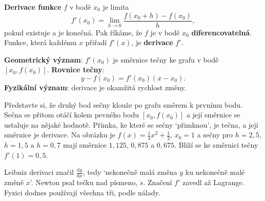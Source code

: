 \begin{definitionbox}
  \textbf{Derivace funkce} $f$ v bodě $x_0$ je limita
  \begin{equation*}
    f'(x_0) = \lim_{h\to 0}\frac{f(x_0 + h) - f(x_0)}{h},
  \end{equation*}
  pokud existuje a je konečná. Pak říkáme, že $f$ je v bodě $x_0$ \textbf{diferencovatelná}. Funkce, která každému $x$ přiřadí $f'(x)$, je \textbf{derivace} $f'$.

  \vspace{0.2cm}

  \textbf{Geometrický význam}: $f'(x_0)$ je směrnice tečny ke grafu v bodě $[x_0, f(x_0)]$. \textbf{Rovnice tečny}:
  \begin{equation*}
    y - f(x_0) = f'(x_0)(x - x_0).
  \end{equation*}
  \textbf{Fyzikální význam}: derivace je okamžitá rychlost změny.
\end{definitionbox}

Představte si, že druhý bod sečny klouže po grafu směrem k prvnímu bodu. Sečna se přitom otáčí kolem pevného bodu $[x_0, f(x_0)]$ a její směrnice se ustaluje na nějaké hodnotě. Přímka, ke které se sečny `přimknou', je tečna, a její směrnice je derivace. Na obrázku je $f(x) = \frac{1}{4}x^2 + \frac{1}{2}$, $x_0 = 1$ a sečny pro $h = 2{,}5$, $h = 1{,}5$ a $h = 0{,}7$ mají směrnice $1{,}125$, $0{,}875$ a $0{,}675$. Blíží se ke směrnici tečny $f'(1) = 0{,}5$.

\begin{center}
\end{center}

Leibniz derivaci značil $\frac{\mathrm{d}y}{\mathrm{d}x}$, tedy `nekonečně malá změna $y$ ku nekonečně malé změně $x$'. Newton psal tečku nad písmeno, $\dot{s}$. Značení $f'$ zavedl až Lagrange. Fyzici dodnes používají všechna tři, podle nálady.

